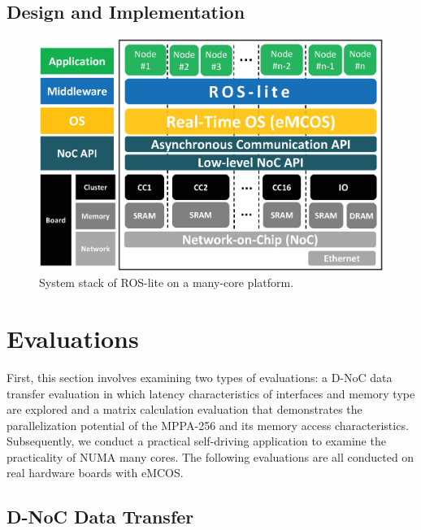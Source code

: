 \section{Design and Implementation}
\label{sec:design_and_implementation}



\begin{figure}[!htbp]
  \centering
  \includegraphics[width=0.7\linewidth]{../figure/roslite/software_stack.eps}
  \caption{\label{fig:rosl_software_stack}
    System stack of ROS-lite on a many-core platform.}
\end{figure}


\chapter{Evaluations}
\label{chap:evaluations}
First, this section involves examining two types of evaluations: a D-NoC data transfer evaluation in which latency characteristics of interfaces and memory type are explored and a matrix calculation evaluation that demonstrates the parallelization potential of the MPPA-256 and its memory access characteristics.
Subsequently, we conduct a practical self-driving application to examine the practicality of NUMA many cores.
The following evaluations are all conducted on real hardware boards with eMCOS.

\section{D-NoC Data Transfer}
\label{sec:dnoc_eval}

